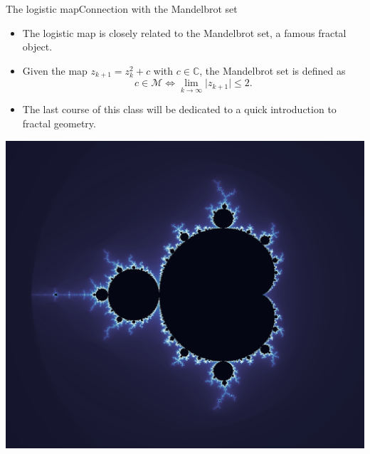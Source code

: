 \documentclass[usenames,dvipsnames,svgnames,10pt,aspectratio=169]{beamer}
\begin{document}
\begin{frame}[t, c]{The logistic map}{Connection with the Mandelbrot set}
	\begin{minipage}{.58\textwidth}
		\begin{itemize}
			\item The logistic map is closely related to the Mandelbrot set, a famous fractal object.

			\medskip

			\item Given the map \( z_{k+1} = z_k^2 + c \) with \( c \in \mathbb{C} \), the Mandelbrot set is defined as
			\[
				c \in \mathcal{M} \iff \lim_{k \to \infty} \vert z_{k+1} \vert \leq 2.
			\]

			\medskip

			\item The last course of this class will be dedicated to a quick introduction to fractal geometry.
		\end{itemize}
	\end{minipage}%
	\hfill
	\begin{minipage}{.38\textwidth}
		\centering
		\includegraphics[width=\textwidth]{Mandelbrot_set}
	\end{minipage}

	\vspace{1cm}
\end{frame}
\end{document}

